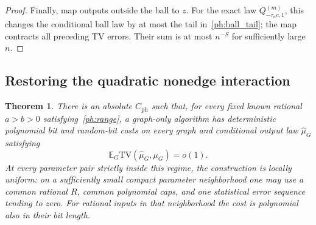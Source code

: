 \documentclass[11pt]{article}
\newcommand{\TV}{\mathrm{TV}}
\def\E{\mathbb{E}}
\newtheorem{thm}{Theorem}[section]
\numberwithin{equation}{section}
\begin{document}
\begin{proof}
Finally, map outputs outside the ball to $z$. For the exact law $Q_{-\tau_nc,1}^{(m)}$, this changes the conditional ball law by at most the tail in~\eqref{ph:ball_tail}; the map contracts all preceding TV errors. Their sum is at most $n^{-S}$ for sufficiently large $n$.
\end{proof}

\subsection{Restoring the quadratic nonedge interaction}

\begin{thm}\label{ph:main}
There is an absolute $C_{\mathrm{ph}}$ such that, for every fixed known rational $a>b>0$ satisfying~\eqref{ph:range}, a graph-only algorithm has deterministic polynomial bit and random-bit costs on every graph and conditional output law $\widehat\mu_G$ satisfying
\[
    \E_G\TV(\widehat\mu_G,\mu_G)=o(1).
\]
At every parameter pair strictly inside this regime, the construction is locally uniform: on a sufficiently small compact parameter neighborhood one may use a common rational $R$, common polynomial caps, and one statistical error sequence tending to zero. For rational inputs in that neighborhood the cost is polynomial also in their bit length.
\end{thm}
\end{document}
